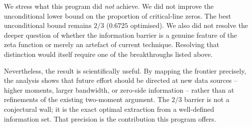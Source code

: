 \documentclass[11pt,a4paper]{article}
\theoremstyle{definition}
\theoremstyle{remark}
\begin{document}
We stress what this program did \emph{not} achieve. We did not improve the unconditional lower bound on the proportion of critical-line zeros. The best unconditional bound remains $2/3$ ($0.6725$ optimised). We also did not resolve the deeper question of whether the information barrier is a genuine feature of the zeta function or merely an artefact of current technique. Resolving that distinction would itself require one of the breakthroughs listed above.

Nevertheless, the result is scientifically useful. By mapping the frontier precisely, the analysis shows that future effort should be directed at new data sources -- higher moments, larger bandwidth, or zero-side information -- rather than at refinements of the existing two-moment argument. The $2/3$ barrier is not a conjectural wall; it is the exact optimal extraction from a well-defined information set. That precision is the contribution this program offers.


\end{document}
